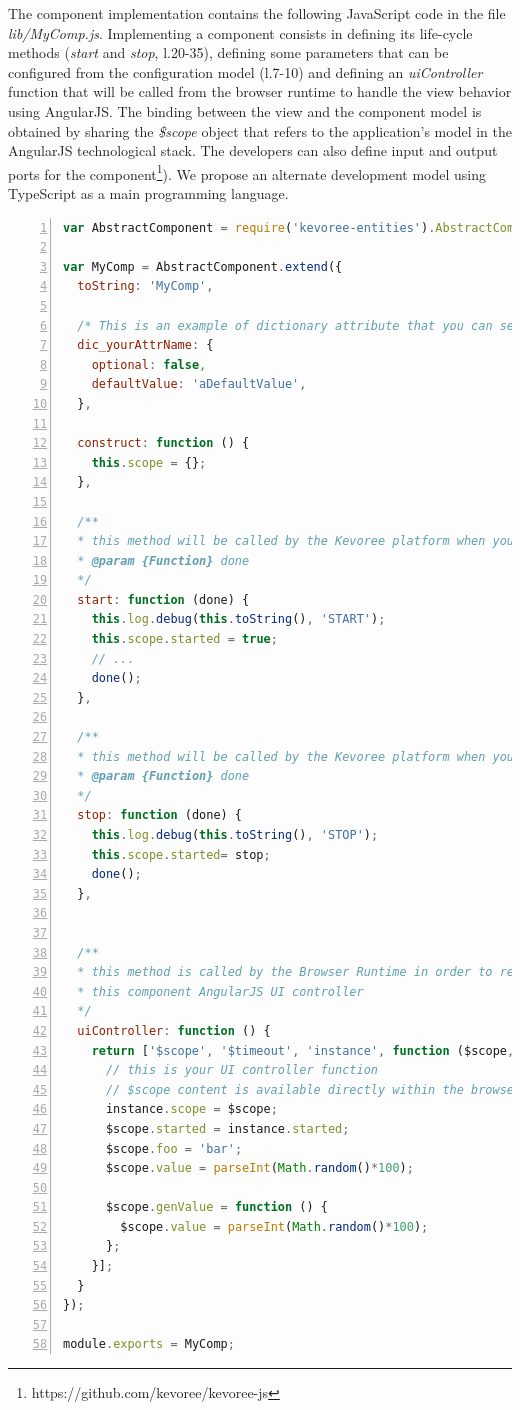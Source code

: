 The component implementation contains the following JavaScript code in the file \emph{lib/MyComp.js}. Implementing a component consists in defining its life-cycle methods (\emph{start} and \emph{stop}, l.20-35), defining some parameters that can be configured from the configuration model (l.7-10) and defining an \emph{uiController} function that will be called from the browser runtime to handle the view behavior using AngularJS. The binding between the view and the component model is obtained by sharing the \emph{\$scope} object  that refers to the application's model in the AngularJS technological stack. The developers can also define input and output ports for the component\footnote{https://github.com/kevoree/kevoree-js}). We propose an alternate development model using TypeScript as a main programming language.



\begin{lstlisting}[language=JavaScript,numbers=left,firstnumber=1,basicstyle=\scriptsize,deletekeywords={port},frame=none,caption={Excerpt of the component implementation}]
var AbstractComponent = require('kevoree-entities').AbstractComponent;

var MyComp = AbstractComponent.extend({
  toString: 'MyComp',

  /* This is an example of dictionary attribute that you can set for your entity */
  dic_yourAttrName: {
    optional: false,
    defaultValue: 'aDefaultValue',
  },

  construct: function () {
    this.scope = {};
  },

  /**
  * this method will be called by the Kevoree platform when your component has to start
  * @param {Function} done
  */
  start: function (done) {
    this.log.debug(this.toString(), 'START');
    this.scope.started = true;
    // ...
    done();
  },

  /**
  * this method will be called by the Kevoree platform when your component has to stop
  * @param {Function} done
  */
  stop: function (done) {
    this.log.debug(this.toString(), 'STOP');
    this.scope.started= stop;
    done();
  },


  /**
  * this method is called by the Browser Runtime in order to retrieve
  * this component AngularJS UI controller
  */
  uiController: function () {
    return ['$scope', '$timeout', 'instance', function ($scope, $timeout, instance) {
      // this is your UI controller function
      // $scope content is available directly within the browser/kevoree-comp-foocomp.html file
      instance.scope = $scope;
      $scope.started = instance.started;
      $scope.foo = 'bar';
      $scope.value = parseInt(Math.random()*100);
      
      $scope.genValue = function () {
        $scope.value = parseInt(Math.random()*100);
      };
    }];
  }
});

module.exports = MyComp;
\end{lstlisting}


